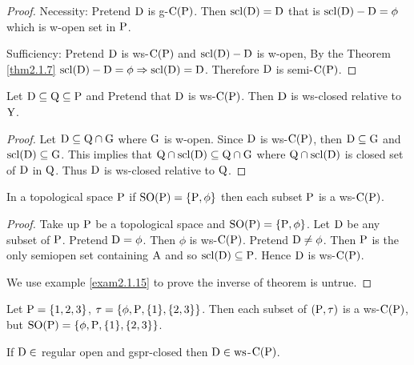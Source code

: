 \begin{proof}
Necessity: Pretend $\mathrm{D}$ is g-$\mathrm{C}(\mathrm{P})$. Then $\mathrm{scl}(\mathrm{D})=\mathrm{D}$ that is $\mathrm{scl}(\mathrm{D})-\mathrm{D}=\phi$ which is w-open set in $\mathrm{P}$.

Sufficiency: Pretend $\mathrm{D}$ is ws-$\mathrm{C}(\mathrm{P})$ and $\mathrm{scl}(\mathrm{D})-\mathrm{D}$ is w-open, By the Theorem \ref{thm2.1.7} $\mathrm{scl}(\mathrm{D})-\mathrm{D}=\phi\Rightarrow \mathrm{scl}(\mathrm{D})=\mathrm{D}$. Therefore $\mathrm{D}$ is semi-$\mathrm{C}(\mathrm{P})$.
\end{proof}

\begin{thm}\label{thm2.1.11}
Let $\mathrm{D}\subseteq \mathrm{Q}\subseteq \mathrm{P}$ and Pretend that $\mathrm{D}$ is ws-$\mathrm{C}(\mathrm{P})$. Then $\mathrm{D}$ is ws-closed relative to $\mathrm{Y}$.
\end{thm}

\begin{proof}
Let $\mathrm{D}\subseteq \mathrm{Q}\cap \mathrm{G}$ where $\mathrm{G}$ is w-open. Since $\mathrm{D}$ is ws-$\mathrm{C}(\mathrm{P})$, then $\mathrm{D}\subseteq \mathrm{G}$ and $\mathrm{scl}(\mathrm{D})\subseteq \mathrm{G}$. This
implies that $\mathrm{Q} \cap \mathrm{scl}(\mathrm{D}) \subseteq \mathrm{Q}\cap \mathrm{G}$ where $\mathrm{Q} \cap \mathrm{scl}(\mathrm{D})$ is closed set of $\mathrm{D}$ in $\mathrm{Q}$. Thus $\mathrm{D}$ is ws-closed
relative to $\mathrm{Q}$.
\end{proof}

\begin{thm}\label{thm2.1.12}
In a topological space $\mathrm{P}$ if $\mathrm{SO}(\mathrm{P}) =\{\mathrm{P}, \phi\}$ then each subset $\mathrm{P}$ is a ws-$\mathrm{C}(\mathrm{P})$.
\end{thm}

\begin{proof}
Take up $\mathrm{P}$ be a topological space and $\mathrm{SO}(\mathrm{P})=\{\mathrm{P}, \phi\}$. Let $\mathrm{D}$ be any subset of $\mathrm{P}$. Pretend $\mathrm{D}=\phi$. Then $\phi$ is ws-$\mathrm{C}(\mathrm{P})$. Pretend $\mathrm{D}\neq\phi$. Then $\mathrm{P}$  is the only semiopen set containing $\mathrm{A}$ and so $\mathrm{scl}(\mathrm{D})\subseteq \mathrm{P}$. Hence $\mathrm{D}$ is ws-$\mathrm{C}(\mathrm{P})$. 

We use example \ref{exam2.1.15} to prove the inverse of theorem is untrue.
\end{proof}

\begin{exm}\label{exam2.1.15}
Let $\mathrm{P}  = \{1, 2, 3\}$, $\tau = \{\phi, \mathrm{P}, \{1\}, \{2, 3\}\}$. Then each subset of $(\mathrm{P},\tau)$ is a ws-$\mathrm{C}(\mathrm{P})$, but $\mathrm{SO}(\mathrm{P})= \{\phi, \mathrm{P}, \{1\}, \{2, 3\}\}$.
\end{exm}

\begin{thm}\label{thm2.1.13}
If $\mathrm{D}\in$ regular open and gspr-closed then $\mathrm{D}\in\mathrm{ws}$-$\mathrm{C}(\mathrm{P})$.
\end{thm}

